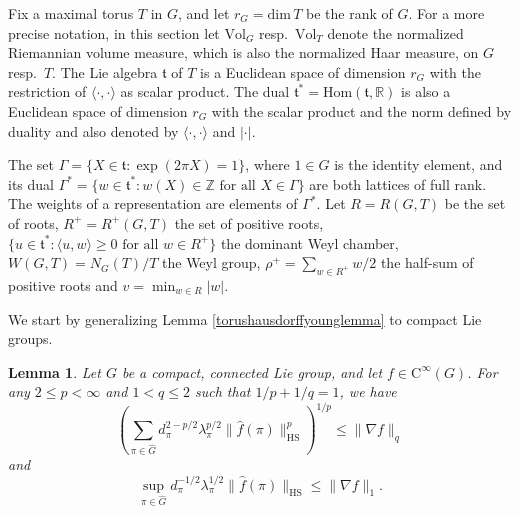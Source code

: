 \documentclass[11pt,a4paper]{article}
\newtheorem{lem}[thm]{Lemma}
\theoremstyle{definition}
\begin{document}
Fix a maximal torus $T$ in $G$, and let $r_G = \mathrm{dim} \, T$ be the rank of $G$. For a more precise notation, in this section let $\mathrm{Vol}_G$ resp.\ $\mathrm{Vol}_T$ denote the normalized Riemannian volume measure, which is also the normalized Haar measure, on $G$ resp.\ $T$. The Lie algebra $\mathfrak{t}$ of $T$ is a Euclidean space of dimension $r_G$ with the restriction of $\langle \cdot, \cdot \rangle$ as scalar product. The dual $\mathfrak{t}^* = \mathrm{Hom}(\mathfrak{t},\mathbb{R})$ is also a Euclidean space of dimension $r_G$ with the scalar product and the norm defined by duality and also denoted by $\langle \cdot , \cdot \rangle$ and $|\cdot|$.

The set $\Gamma = \{ X \in \mathfrak{t} : \exp (2 \pi X) =1 \}$, where $1 \in G$ is the identity element, and its dual $\Gamma^* = \{ w \in \mathfrak{t}^* : w(X) \in \mathbb{Z} \textrm{ for all } X \in \Gamma \}$ are both lattices of full rank. The weights of a representation are elements of $\Gamma^*$. Let $R=R(G,T)$ be the set of roots, $R^+=R^+(G,T)$ the set of positive roots, $\{ u \in \mathfrak{t}^* : \langle u, w \rangle \ge 0 \textrm{ for all } w \in R^+ \}$ the dominant Weyl chamber, $W(G,T)=N_G(T)/T$ the Weyl group, $\rho^+=\sum_{w \in R^+} w/2$ the half-sum of positive roots and $v=\min_{w \in R} |w|$.

We start by generalizing Lemma \ref{torushausdorffyounglemma} to compact Lie groups.
\begin{lem}\label{liegrouphausdorffyounglemma} Let $G$ be a compact, connected Lie group, and let $f \in \mathrm{C}^{\infty}(G)$. For any $2 \le p < \infty$ and $1<q \le 2$ such that $1/p+1/q=1$, we have
\[ \left( \sum_{\pi \in \widehat{G}} d_{\pi}^{2-p/2} \lambda_{\pi}^{p/2} \| \widehat{f} (\pi) \|_{\mathrm{HS}}^p \right)^{1/p} \le \| \nabla f \|_q \]
and
\[ \sup_{\pi \in \widehat{G}} d_{\pi}^{-1/2} \lambda_{\pi}^{1/2} \| \widehat{f} (\pi) \|_{\mathrm{HS}} \le \| \nabla f \|_1 . \]
\end{lem}
\end{document}
